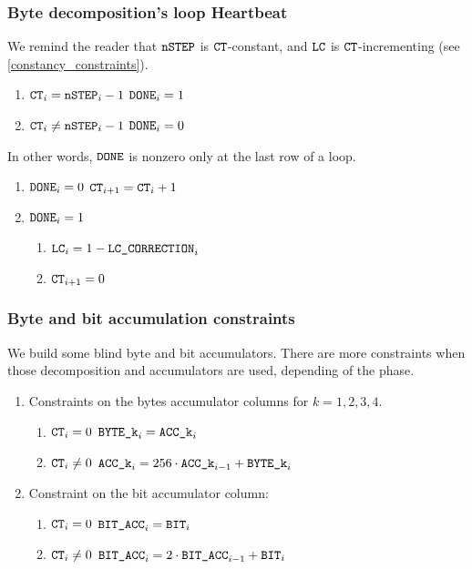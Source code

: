 \subsubsection{Byte decomposition's loop Heartbeat}
\begin{center}
\end{center}
We remind the reader that $\texttt{nSTEP}$ is $\texttt{CT}$-constant, and $\texttt{LC}$ is $\texttt{CT}$-incrementing (see \ref{constancy_constraints}).
\begin{enumerate}
    \item \If $\texttt{CT}_{i}=\texttt{nSTEP}_{i}-1$ \Then $\texttt{DONE}_{i}=1$
    \item \If $\texttt{CT}_{i} \neq \texttt{nSTEP}_{i}-1$ \Then $\texttt{DONE}_{i}=0$
\end{enumerate}
In other words, $\texttt{DONE}$ is nonzero only at the last row of a loop.
\begin{enumerate}[resume]
    \item \If $\texttt{DONE}_{i}=0$ \Then $\texttt{CT}_{i+1} = \texttt{CT}_{i} +1$
    \item \If $\texttt{DONE}_{i}=1$ \Then
    \begin{enumerate}
        \item $\texttt{LC}_{i}=1-\texttt{LC\_CORRECTION}_{i}$
        \item $\texttt{CT}_{i+1} = 0$
    \end{enumerate}
\end{enumerate}

\subsubsection{Byte and bit accumulation constraints}
We build some blind byte and bit accumulators. There are more constraints when those decomposition and accumulators are used, depending of the phase.
\begin{enumerate}
    \item Constraints on the bytes accumulator columns for $k= 1,2, 3, 4$.
    \begin{enumerate}
        \item \If $\texttt{CT}_{i}=0$ \Then $\texttt{BYTE}\texttt{\_k}_{i} = \texttt{ACC}\texttt{\_k}_{i}$
        \item \If $\texttt{CT}_{i} \neq 0$  \Then $\texttt{ACC}\texttt{\_k}_{i}=256 \cdot \texttt{ACC}\texttt{\_k}_{i-1} + \texttt{BYTE}\texttt{\_k}_{i}$
    \end{enumerate}
    \item Constraint on the bit accumulator column:
    \begin{enumerate}
        \item \If $\texttt{CT}_{i}=0$ \Then $\texttt{BIT\_ACC}_{i} = \texttt{BIT}_{i}$
        \item \If $\texttt{CT}_{i} \neq 0$  \Then $\texttt{BIT\_ACC}_{i}=2 \cdot \texttt{BIT\_ACC}_{i-1} + \texttt{BIT}_{i}$
    \end{enumerate}
\end{enumerate}

